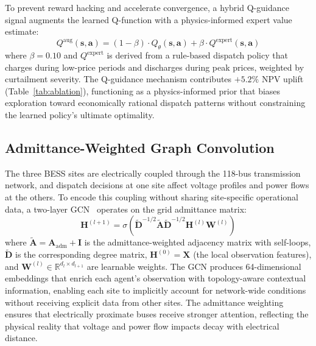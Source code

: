 \documentclass[journal]{IEEEtran}
\begin{document}
To prevent reward hacking and accelerate convergence, a hybrid
Q-guidance signal augments the learned Q-function with a
physics-informed expert value estimate:
\begin{equation}
  Q^{\mathrm{aug}}(\mathbf{s},\mathbf{a}) =
    (1-\beta)\cdot Q_\theta(\mathbf{s},\mathbf{a}) +
    \beta\cdot Q^{\mathrm{expert}}(\mathbf{s},\mathbf{a})
  \label{eq:qguidance}
\end{equation}
where $\beta = 0.10$ and $Q^{\mathrm{expert}}$ is derived from a
rule-based dispatch policy that charges during low-price periods and
discharges during peak prices, weighted by curtailment severity.
The Q-guidance mechanism contributes $+5.2\%$ NPV uplift
(Table~\ref{tab:ablation}), functioning as a physics-informed prior that
biases exploration toward economically rational dispatch patterns
without constraining the learned policy's ultimate optimality.

\subsection{Admittance-Weighted Graph Convolution}

The three BESS sites are electrically coupled through the 118-bus
transmission network, and dispatch decisions at one site affect voltage
profiles and power flows at the others. To encode this coupling without
sharing site-specific operational data, a two-layer GCN~\cite{kipf2017gcn}
operates on the grid admittance matrix:
\begin{equation}
  \mathbf{H}^{(l+1)} = \sigma\!\left(
    \tilde{\mathbf{D}}^{-1/2}\tilde{\mathbf{A}}\tilde{\mathbf{D}}^{-1/2}
    \mathbf{H}^{(l)}\mathbf{W}^{(l)}\right)
  \label{eq:gcn}
\end{equation}
where $\tilde{\mathbf{A}} = \mathbf{A}_{\mathrm{adm}} + \mathbf{I}$ is
the admittance-weighted adjacency matrix with self-loops,
$\tilde{\mathbf{D}}$ is the corresponding degree matrix,
$\mathbf{H}^{(0)} = \mathbf{X}$ (the local observation features), and
$\mathbf{W}^{(l)} \in \mathbb{R}^{d_l \times d_{l+1}}$ are learnable
weights. The GCN produces 64-dimensional embeddings that enrich each
agent's observation with topology-aware contextual information, enabling
each site to implicitly account for network-wide conditions without
receiving explicit data from other sites. The admittance weighting
ensures that electrically proximate buses receive stronger attention,
reflecting the physical reality that voltage and power flow impacts decay
with electrical distance.
\end{document}
